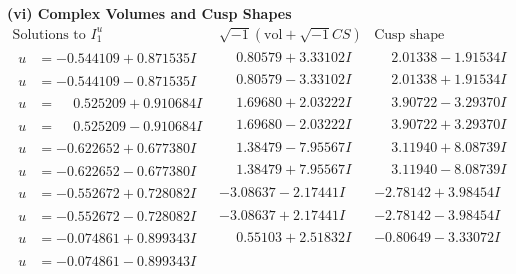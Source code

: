 \documentclass[1p]{elsarticle_modified}
\theoremstyle{definition}
\newcommand{\I}{\sqrt{-1}}
\begin{document}
\newpage\flushleft \textbf{(vi) Complex Volumes and Cusp Shapes}
$$\begin{array}{c|c|c}  
\text{Solutions to }I^u_{1}& \I (\text{vol} + \sqrt{-1}CS) & \text{Cusp shape}\\
 \hline 
\begin{aligned}
u &= -0.544109 + 0.871535 I\end{aligned}
 & \phantom{-}0.80579 + 3.33102 I & \phantom{-}2.01338 - 1.91534 I \\ \hline\begin{aligned}
u &= -0.544109 - 0.871535 I\end{aligned}
 & \phantom{-}0.80579 - 3.33102 I & \phantom{-}2.01338 + 1.91534 I \\ \hline\begin{aligned}
u &= \phantom{-}0.525209 + 0.910684 I\end{aligned}
 & \phantom{-}1.69680 + 2.03222 I & \phantom{-}3.90722 - 3.29370 I \\ \hline\begin{aligned}
u &= \phantom{-}0.525209 - 0.910684 I\end{aligned}
 & \phantom{-}1.69680 - 2.03222 I & \phantom{-}3.90722 + 3.29370 I \\ \hline\begin{aligned}
u &= -0.622652 + 0.677380 I\end{aligned}
 & \phantom{-}1.38479 - 7.95567 I & \phantom{-}3.11940 + 8.08739 I \\ \hline\begin{aligned}
u &= -0.622652 - 0.677380 I\end{aligned}
 & \phantom{-}1.38479 + 7.95567 I & \phantom{-}3.11940 - 8.08739 I \\ \hline\begin{aligned}
u &= -0.552672 + 0.728082 I\end{aligned}
 & -3.08637 - 2.17441 I & -2.78142 + 3.98454 I \\ \hline\begin{aligned}
u &= -0.552672 - 0.728082 I\end{aligned}
 & -3.08637 + 2.17441 I & -2.78142 - 3.98454 I \\ \hline\begin{aligned}
u &= -0.074861 + 0.899343 I\end{aligned}
 & \phantom{-}0.55103 + 2.51832 I & -0.80649 - 3.33072 I \\ \hline\begin{aligned}
u &= -0.074861 - 0.899343 I\end{aligned}

\end{array}$$
\end{document}
